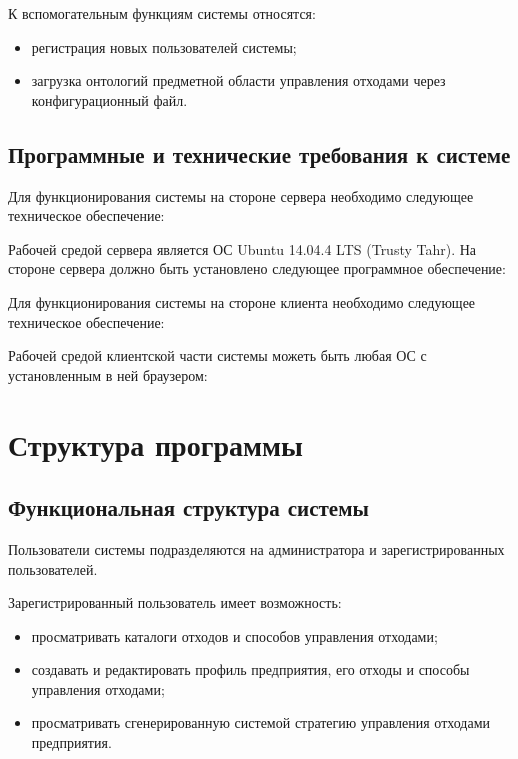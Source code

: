 \documentclass[a4paper]{G2-105}
\begin{document}
К вспомогательным функциям системы относятся:
\begin{itemize}
\item регистрация новых пользователей системы;
\item загрузка онтологий предметной области управления отходами через конфигурационный файл.
\end{itemize}

\section{Программные и технические требования к системе}

Для функционирования системы на стороне сервера необходимо следующее техническое обеспечение:
\CommonSystemRequirements

Рабочей средой сервера является ОС Ubuntu 14.04.4 LTS (Trusty Tahr). На стороне сервера должно быть установлено следующее программное обеспечение:
\CommonSoftwareRequirements

Для функционирования системы на стороне клиента необходимо следующее техническое обеспечение:
\CommonClientRequirements

Рабочей средой клиентской части системы можеть быть любая ОС с установленным в ней браузером:
\CommonBrowserRequirements

\chapter{Структура программы}

\ttl

\section{Функциональная структура системы}

Пользователи системы подразделяются на администратора и зарегистрированных пользователей.

Зарегистрированный пользователь имеет возможность:
\begin{itemize}
\item просматривать каталоги отходов и способов управления отходами;
\item создавать и редактировать профиль предприятия, его отходы и способы управления отходами;
\item просматривать сгенерированную системой стратегию управления отходами предприятия.
\end{itemize}
\end{document}
